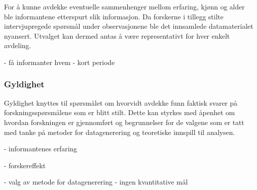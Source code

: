 \noindent
For å kunne avdekke eventuelle sammenhenger mellom erfaring, kjønn og alder ble informantene etterspurt slik informasjon. Da forskerne i tillegg stilte intervjupregede spørsmål under observasjonene ble det innsamlede datamaterialet nyansert. Utvalget kan dermed antas å være representativt for hver enkelt avdeling. 

- få informanter
	 hvem
- kort periode 

\subsubsection{Gyldighet}
Gyldighet knyttes til spørsmålet om hvorvidt avdekke funn faktisk svarer på forskningsspørsmålene som er blitt stilt. Dette kan styrkes med åpenhet om hvordan forskningen er gjennomført og begrunnelser for de valgene som er tatt med tanke på metoder for datagenerering og teoretiske innspill til analysen. 

- informantenes erfaring

- forskereffekt

- valg av metode for datagenerering
	- ingen kvantitative mål